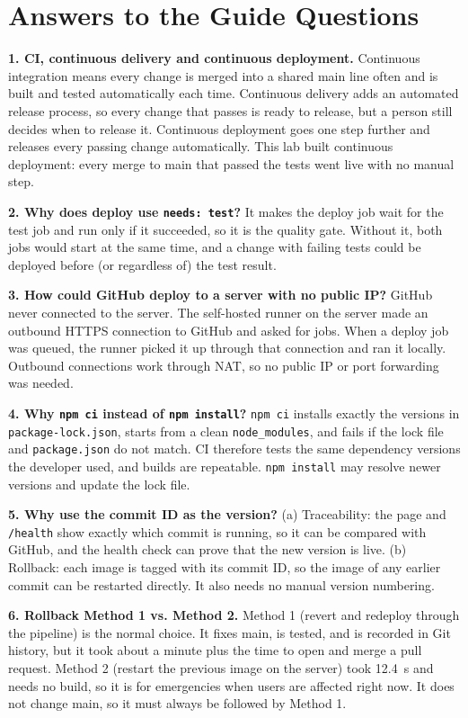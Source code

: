 \documentclass[conference]{IEEEtran}
\begin{document}
\section{Answers to the Guide Questions}
\textbf{1. CI, continuous delivery and continuous deployment.} Continuous integration means every change is merged into a shared main line often and is built and tested automatically each time. Continuous delivery adds an automated release process, so every change that passes is ready to release, but a person still decides when to release it. Continuous deployment goes one step further and releases every passing change automatically. This lab built continuous deployment: every merge to main that passed the tests went live with no manual step.

\textbf{2. Why does deploy use \texttt{needs: test}?} It makes the deploy job wait for the test job and run only if it succeeded, so it is the quality gate. Without it, both jobs would start at the same time, and a change with failing tests could be deployed before (or regardless of) the test result.

\textbf{3. How could GitHub deploy to a server with no public IP?} GitHub never connected to the server. The self-hosted runner on the server made an outbound HTTPS connection to GitHub and asked for jobs. When a deploy job was queued, the runner picked it up through that connection and ran it locally. Outbound connections work through NAT, so no public IP or port forwarding was needed.

\textbf{4. Why \texttt{npm ci} instead of \texttt{npm install}?} \texttt{npm ci} installs exactly the versions in \texttt{package-lock.json}, starts from a clean \texttt{node\_modules}, and fails if the lock file and \texttt{package.json} do not match. CI therefore tests the same dependency versions the developer used, and builds are repeatable. \texttt{npm install} may resolve newer versions and update the lock file.

\textbf{5. Why use the commit ID as the version?} (a) Traceability: the page and \texttt{/health} show exactly which commit is running, so it can be compared with GitHub, and the health check can prove that the new version is live. (b) Rollback: each image is tagged with its commit ID, so the image of any earlier commit can be restarted directly. It also needs no manual version numbering.

\textbf{6. Rollback Method 1 vs. Method 2.} Method 1 (revert and redeploy through the pipeline) is the normal choice. It fixes main, is tested, and is recorded in Git history, but it took about a minute plus the time to open and merge a pull request. Method 2 (restart the previous image on the server) took 12.4~s and needs no build, so it is for emergencies when users are affected right now. It does not change main, so it must always be followed by Method 1.
\end{document}
